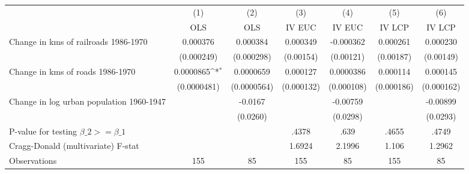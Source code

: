 {
\def\sym#1{\ifmmode^{#1}\else\(^{#1}\)\fi}
\begin{tabular}{l*{6}{c}}
\hline\hline
                &\multicolumn{1}{c}{(1)}&\multicolumn{1}{c}{(2)}&\multicolumn{1}{c}{(3)}&\multicolumn{1}{c}{(4)}&\multicolumn{1}{c}{(5)}&\multicolumn{1}{c}{(6)}\\
                &\multicolumn{1}{c}{OLS}&\multicolumn{1}{c}{OLS}&\multicolumn{1}{c}{IV EUC}&\multicolumn{1}{c}{IV EUC}&\multicolumn{1}{c}{IV LCP}&\multicolumn{1}{c}{IV LCP}\\
\hline
Change in kms of railroads 1986-1970& 0.000376         & 0.000384         & 0.000349         &-0.000362         & 0.000261         & 0.000230         \\
                &(0.000249)         &(0.000298)         &(0.00154)         &(0.00121)         &(0.00187)         &(0.00149)         \\
[1em]
Change in kms of roads 1986-1970&0.0000865\sym{*}  &0.0000659         & 0.000127         &0.0000386         & 0.000114         & 0.000145         \\
                &(0.0000481)         &(0.0000564)         &(0.000132)         &(0.000108)         &(0.000186)         &(0.000162)         \\
[1em]
Change in log urban population 1960-1947&                  &  -0.0167         &                  & -0.00759         &                  & -0.00899         \\
                &                  & (0.0260)         &                  & (0.0298)         &                  & (0.0293)         \\
\hline
P-value for testing $\beta\_{2} >= \beta\_{1}$&                  &                  &    .4378         &     .639         &    .4655         &    .4749         \\
Cragg-Donald (multivariate) F-stat&                  &                  &   1.6924         &   2.1996         &    1.106         &   1.2962         \\
Observations    &      155         &       85         &      155         &       85         &      155         &       85         \\
\hline\hline
\end{tabular}
}
